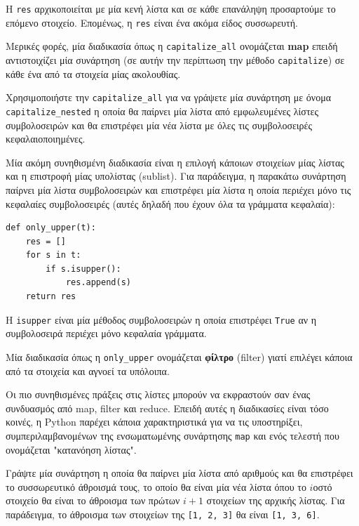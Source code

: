 \documentclass[10pt]{book}
\begin{document}
Η {\tt res} αρχικοποιείται με μία κενή λίστα και σε κάθε επανάληψη προσαρτούμε το επόμενο στοιχείο. Επομένως, η {\tt res} είναι ένα ακόμα είδος συσσωρευτή.

Μερικές φορές, μία διαδικασία όπως η \verb"capitalize_all" ονομάζεται {\bf map} 
επειδή αντιστοιχίζει μία συνάρτηση (σε αυτήν την περίπτωση την μέθοδο {\tt capitalize}) σε κάθε ένα από τα στοιχεία μίας ακολουθίας.
\\

\begin{exercise}

Χρησιμοποιήστε την \verb"capitalize_all" για να γράψετε μία συνάρτηση με όνομα  \verb"capitalize_nested" η οποία θα παίρνει μία λίστα από εμφωλευμένες λίστες συμβολοσειρών και θα επιστρέφει μία νέα λίστα με όλες τις συμβολοσειρές κεφαλαιοποιημένες.
\end{exercise}

Μία ακόμη συνηθισμένη διαδικασία είναι η επιλογή κάποιων στοιχείων μίας λίστας και η επιστροφή μίας υπολίστας (sublist). Για παράδειγμα, η παρακάτω συνάρτηση παίρνει μία λίστα συμβολοσειρών και επιστρέφει μία λίστα η οποία περιέχει
μόνο τις κεφαλαίες συμβολοσειρές (αυτές δηλαδή που έχουν όλα τα γράμματα κεφαλαία):

\begin{verbatim}
def only_upper(t):
    res = []
    for s in t:
        if s.isupper():
            res.append(s)
    return res
\end{verbatim}
%

Η {\tt isupper} είναι μία μέθοδος συμβολοσειρών η οποία επιστρέφει {\tt True}
αν η συμβολοσειρά περιέχει μόνο κεφαλαία γράμματα.

Μία διαδικασία όπως η \verb"only_upper" ονομάζεται {\bf φίλτρο} (filter) γιατί επιλέγει κάποια από τα στοιχεία και αγνοεί τα υπόλοιπα.

Οι πιο συνηθισμένες πράξεις στις λίστες μπορούν να εκφραστούν σαν ένας συνδυασμός από map, filter και reduce. Επειδή αυτές η διαδικασίες είναι τόσο κοινές, η  Python παρέχει κάποια χαρακτηριστικά για να τις υποστηρίξει, συμπεριλαμβανομένων της ενσωματωμένης συνάρτησης {\tt map} και ενός τελεστή που ονομάζεται "κατανόηση λίστας".
\\


\begin{exercise}
\label{cumulative}

Γράψτε μία συνάρτηση η οποία θα παίρνει μία λίστα από αριθμούς και θα επιστρέφει το συσσωρευτικό άθροισμά τους, το οποίο θα είναι μία νέα λίστα όπου το $i$οστό στοιχείο θα είναι το άθροισμα των πρώτων $i+1$ στοιχείων της αρχικής λίστας. Για παράδειγμα, το άθροισμα των στοιχείων της {\tt [1, 2, 3]} θα είναι {\tt [1, 3, 6]}.
\end{exercise}
\end{document}
